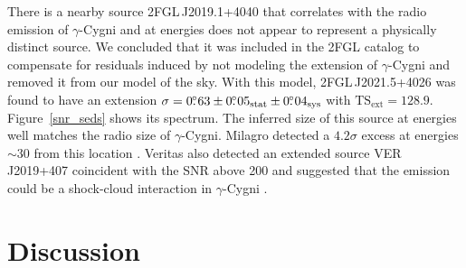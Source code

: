 \documentclass[12pt,preprint]{aastex}
\newcommand{\gev}{\text{GeV}\xspace}
\newcommand{\tev}{\text{TeV}\xspace}
\newcommand{\tsext}{{\ensuremath{\text{TS}_{\text{ext}}}}\xspace}
\newcommand{\sys}{\text{sys}\xspace}
\newcommand{\stat}{\text{stat}\xspace}
\begin{document}
There is a nearby source 2FGL\,J2019.1+4040 that correlates with the radio
emission of $\gamma$-Cygni and at \gev energies 
does not appear to represent a physically
distinct source.  We concluded that it was included in the 2FGL catalog to compensate
for residuals induced by not modeling the extension of $\gamma$-Cygni and
removed it from our model of the sky.  With this model, 2FGL\,J2021.5+4026
was found to have an extension $\sigma=0\fdg63\pm0\fdg05_\stat\pm0\fdg04_\sys$
with $\tsext=128.9$.  Figure~\ref{snr_seds}
shows its spectrum.  The inferred size of this source at \gev energies
well matches the radio size of $\gamma$-Cygni.  Milagro detected
a $4.2\sigma$ excess at energies $\sim 30$ \tev from this location
\citep{lat_bsl,milagro_bright_source_list}.  Veritas also detected an
extended source VER\,J2019+407 coincident with the SNR above 200 \gev
and suggested that the \tev emission could be a shock-cloud interaction
in $\gamma$-Cygni \citep{veritas_gamma_cygni}.






\section{Discussion}
\end{document}
